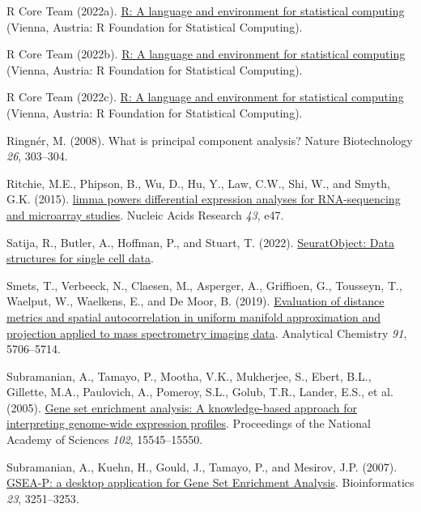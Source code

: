 \documentclass[
  parskip,
  oneside]{scrreprt}
\newlength{\cslhangindent}
\newlength{\cslentryspacingunit} %
\newenvironment{CSLReferences}[2] %
 {%
  \setlength{\parindent}{0pt}
  \ifodd #1
  \let\oldpar\par
  \def\par{\hangindent=\cslhangindent\oldpar}
  \fi
  \setlength{\parskip}{#2\cslentryspacingunit}
 }%
 {}
\begin{document}
\begin{CSLReferences}{0}{0}
\leavevmode{}%
R Core Team (2022a). \href{https://www.R-project.org/}{R: A language and
environment for statistical computing} (Vienna, Austria: R Foundation
for Statistical Computing).

\leavevmode{}%
R Core Team (2022b). \href{https://www.R-project.org/}{R: A language and
environment for statistical computing} (Vienna, Austria: R Foundation
for Statistical Computing).

\leavevmode{}%
R Core Team (2022c). \href{https://www.R-project.org/}{R: A language and
environment for statistical computing} (Vienna, Austria: R Foundation
for Statistical Computing).

\leavevmode{}%
Ringnér, M. (2008). What is principal component analysis? Nature
Biotechnology \emph{26}, 303--304.

\leavevmode{}%
Ritchie, M.E., Phipson, B., Wu, D., Hu, Y., Law, C.W., Shi, W., and
Smyth, G.K. (2015). \href{https://doi.org/10.1093/nar/gkv007}{{limma}
powers differential expression analyses for {RNA}-sequencing and
microarray studies}. Nucleic Acids Research \emph{43}, e47.

\leavevmode{}%
Satija, R., Butler, A., Hoffman, P., and Stuart, T. (2022).
\href{https://CRAN.R-project.org/package=SeuratObject}{SeuratObject:
Data structures for single cell data}.

\leavevmode{}%
Smets, T., Verbeeck, N., Claesen, M., Asperger, A., Griffioen, G.,
Tousseyn, T., Waelput, W., Waelkens, E., and De Moor, B. (2019).
\href{https://doi.org/10.1021/acs.analchem.8b05827}{Evaluation of
distance metrics and spatial autocorrelation in uniform manifold
approximation and projection applied to mass spectrometry imaging data}.
Analytical Chemistry \emph{91}, 5706--5714.

\leavevmode{}%
Subramanian, A., Tamayo, P., Mootha, V.K., Mukherjee, S., Ebert, B.L.,
Gillette, M.A., Paulovich, A., Pomeroy, S.L., Golub, T.R., Lander, E.S.,
et al. (2005). \href{https://doi.org/10.1073/pnas.0506580102}{Gene set
enrichment analysis: A knowledge-based approach for interpreting
genome-wide expression profiles}. Proceedings of the National Academy of
Sciences \emph{102}, 15545--15550.

\leavevmode{}%
Subramanian, A., Kuehn, H., Gould, J., Tamayo, P., and Mesirov, J.P.
(2007). \href{https://doi.org/10.1093/bioinformatics/btm369}{{GSEA-P: a
desktop application for Gene Set Enrichment Analysis}}. Bioinformatics
\emph{23}, 3251--3253.


\end{CSLReferences}
\end{document}
